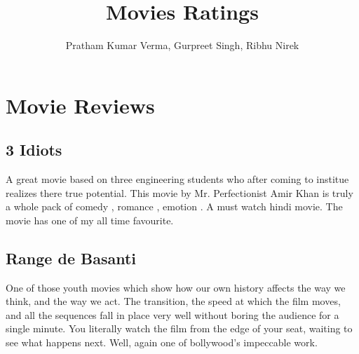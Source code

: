 \documentclass{article}
\title{Movies Ratings}
\author{Pratham Kumar Verma, Gurpreet Singh, Ribhu Nirek}
\date{}
\begin{document}
\maketitle

\section*{Movie Reviews}
	
	\subsection*{3 Idiots}
	    A great movie based on three engineering students who after coming to institue realizes there true potential. This movie by Mr. Perfectionist Amir Khan is truly a whole pack of comedy , romance , emotion . A must watch hindi movie. The movie has one of my all time favourite. 

	\subsection*{Range de Basanti}

		One of those youth movies which show how our own history affects the way we think, and the way we act. The transition, the speed at which the film moves, and all the sequences fall in place very well without boring the audience for a single minute. You literally watch the film from the edge of your seat, waiting to see what happens next. Well, again one of bollywood's impeccable work.
\end{document}
